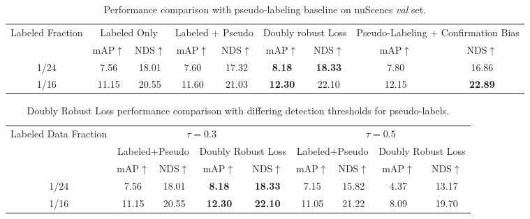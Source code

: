 \begin{table}[!htbp]
\centering
\caption{Performance comparison with pseudo-labeling baseline on nuScenes \textit{val} set.}
    \begin{adjustbox}{width=\textwidth}
    \begin{tabular}{c |c  c | c  c | c  c | c  c }
    \hline
    \multirow{2}{*}{Labeled  Fraction} & \multicolumn{2}{c|}{Labeled Only} & \multicolumn{2}{c|}{Labeled + Pseudo} & \multicolumn{2}{c|}{Doubly robust Loss}
    & \multicolumn{2}{c}{Pseudo-Labeling + Confirmation Bias}\\
     & mAP$\uparrow$ & NDS$\uparrow$ & mAP$\uparrow$ & NDS$\uparrow$ & mAP$\uparrow$ & NDS$\uparrow$ & mAP$\uparrow$ & NDS$\uparrow$\\
     \hline
     1/24 & 7.56 & 18.01 & 7.60 & 17.32 & \textbf{8.18} & \textbf{18.33} & 7.80 & 16.86\\
     1/16 & 11.15 & 20.55 & 11.60 & 21.03 & \textbf{12.30} & {22.10} & 12.15 & \textbf{22.89}\\
     \hline
    \end{tabular}
    \end{adjustbox}
\vspace{-6pt}
\label{tab:confirmation_bias}
\end{table}
\begin{table}[!htbp]
\centering
\caption{Doubly Robust Loss performance comparison with differing detection thresholds for pseudo-labels.}
    \begin{adjustbox}{width=\textwidth}
    \begin{tabular}{c |c  c  c  c | c  c  c  c}
    \hline
    \multirow{3}{*}{Labeled Data Fraction} & \multicolumn{4}{c|}{$\tau = 0.3$} & \multicolumn{4}{c}{$\tau = 0.5$}\\
     & \multicolumn{2}{c}{Labeled+Pseudo} & \multicolumn{2}{c|}{Doubly Robust Loss} & \multicolumn{2}{c}{Labeled+Pseudo} & \multicolumn{2}{c}{Doubly Robust Loss} \\   
     & mAP$\uparrow$ & NDS$\uparrow$ & mAP$\uparrow$ & NDS$\uparrow$ & mAP$\uparrow$ & NDS$\uparrow$ & mAP$\uparrow$ & NDS$\uparrow$ \\
     \hline
     1/24 & 7.56 & 18.01 & \textbf{8.18} & \textbf{18.33} & 7.15 & 15.82 & 4.37 & 13.17\\
     1/16 & 11.15 & 20.55 & \textbf{12.30} & \textbf{22.10} & 11.05 & 21.22 & 8.09 & 19.70 \\
     \hline
    \end{tabular}
    \end{adjustbox}
\vspace{-6pt}
\end{table}


